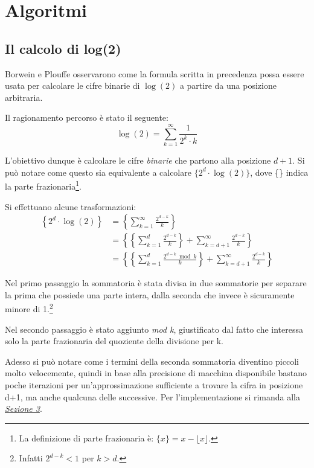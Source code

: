 \section{Algoritmi}

\subsection{Il calcolo di log(2)}
Borwein e Plouffe osservarono come la formula scritta in precedenza possa essere usata per calcolare le cifre binarie di $\log(2)$ a partire da una posizione arbitraria.

\noindent Il ragionamento percorso è stato il seguente:
$$\log(2) = \sum\limits_{k=1}^{\infty} \frac{1}{2^k \cdot k}$$

\noindent L'obiettivo dunque è calcolare le cifre \textit{binarie} che partono alla posizione $d+1$. Si può notare come questo sia equivalente a calcolare $\{2^d \cdot \log(2)\}$, dove \{\} indica la parte frazionaria\footnote{La definizione di parte frazionaria è: $\{x\} = x - \lfloor x \rfloor$.}.

Si effettuano alcune trasformazioni:
\begin{equation*}
\begin{split}
\left\{2^d \cdot \log(2)\right\}
& = \left\{ \sum\limits_{k=1}^{\infty} \frac{2^{d-k}}{k} \right\} \\
& = \left\{ \left\{ \sum\limits_{k=1}^{d} \frac{2^{d-k}}{k} \right\} + \sum\limits_{k=d+1}^{\infty} \frac{2^{d-k}}{k} \right\} \\
& = \left\{ \left\{ \sum\limits_{k=1}^{d} \frac{2^{d-k}\bmod k}{k} \right\} + \sum\limits_{k=d+1}^{\infty} \frac{2^{d-k}}{k} \right\}
\end{split}
\end{equation*}

Nel primo passaggio la sommatoria è stata divisa in due sommatorie per separare la prima che possiede una parte intera, dalla seconda che invece è sicuramente minore di 1.\footnote{Infatti $2^{d-k} < 1$ per $k > d$.}

Nel secondo passaggio è stato aggiunto \textit{mod k}, giustificato dal fatto che interessa solo la parte frazionaria del quoziente della divisione per k.

Adesso si può notare come i termini della seconda sommatoria diventino piccoli molto velocemente, quindi in base alla precisione di macchina disponibile bastano poche iterazioni per un'approssimazione sufficiente a trovare la cifra in posizione d+1, ma anche qualcuna delle successive.
\bigbreak \noindent
Per l'implementazione si rimanda alla \hyperref[sec:impl]{\textit{Sezione 3}}.

